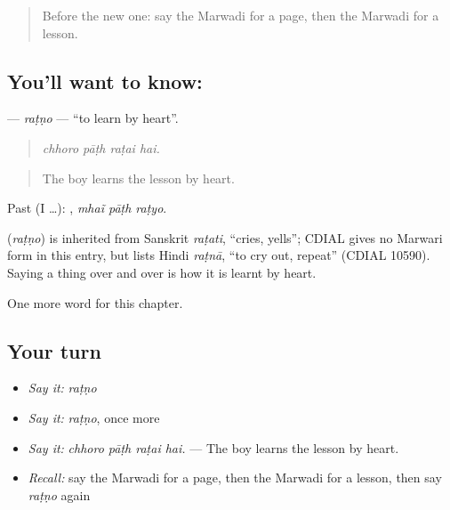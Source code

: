 \label{lesson:MW-C285-ratno}



\begin{quote}
Before the new one: say the Marwadi for a page, then the Marwadi for a lesson.
\end{quote}

\subsection*{You'll want to know: }
\textbf{} — \emph{raṭṇo} — \textquotedblleft{}to learn by heart\textquotedblright{}.

\begin{quote}
   
\end{quote}

\begin{quote}
\emph{chhoro pāṭh raṭai hai.}
\end{quote}

\begin{quote}
The boy learns the lesson by heart.
\end{quote}

Past (I …):   , \emph{mhaĩ pāṭh raṭyo}.

\begin{cousinweb}
\textbf{} (\emph{raṭṇo}) is inherited from Sanskrit \emph{raṭati}, \textquotedblleft{}cries, yells\textquotedblright{}; CDIAL gives no Marwari form in this entry, but lists Hindi \emph{raṭnā}, \textquotedblleft{}to cry out, repeat\textquotedblright{} (CDIAL 10590). Saying a thing over and over is how it is learnt by heart.
\end{cousinweb}

\begin{grammarlens}[title={What you've built}]
One more word for this chapter.
\end{grammarlens}

\subsection*{Your turn}
\begin{itemize}
\raggedright
  \item \emph{Say it:} \emph{raṭṇo}
  \item \emph{Say it:} \emph{raṭṇo}, once more
  \item \emph{Say it:} \emph{chhoro pāṭh raṭai hai.} — The boy learns the lesson by heart.
  \item \emph{Recall:} say the Marwadi for a page, then the Marwadi for a lesson, then say \emph{raṭṇo} again
\end{itemize}

